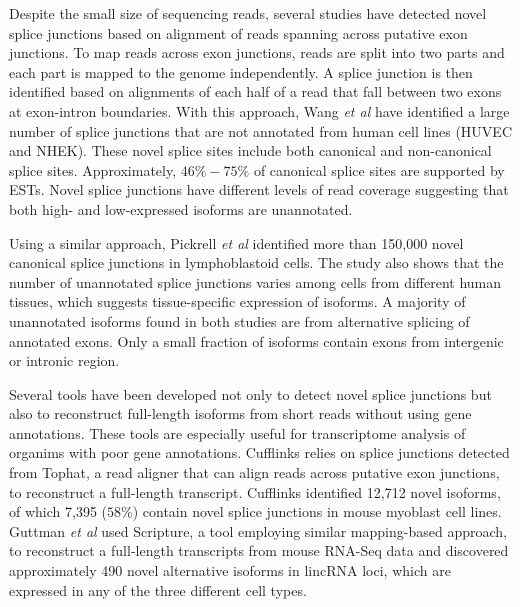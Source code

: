 \documentclass[10pt]{article}
\begin{document}

Despite the small size of sequencing reads, several studies have detected
novel splice junctions based on alignment of reads spanning across putative exon junctions.
To map reads across exon junctions, reads are split into two parts and each part is mapped
to the genome independently.
A splice junction is then identified based on alignments of each half of a read
that fall between two exons at exon-intron boundaries.
With this approach, Wang \emph{et al} have identified a large number of
splice junctions that are not annotated from human cell lines (HUVEC and NHEK)\cite{Wang:2011jq}.
These novel splice sites include both canonical and non-canonical splice sites.
Approximately, $46\%-75\%$ of canonical splice sites are supported by ESTs.
Novel splice junctions have different levels of read coverage suggesting that both high-
and low-expressed isoforms are unannotated.

Using a similar approach, Pickrell \emph{et al} identified more than 150,000 novel canonical splice junctions
in lymphoblastoid cells.
The study also shows that the number of unannotated splice junctions varies among cells from
different human tissues, which suggests tissue-specific expression of isoforms\cite{Pickrell:2010gt}.
A majority of unannotated isoforms found in both studies are from alternative splicing
of annotated exons. Only a small fraction of isoforms contain exons from intergenic or
intronic region.

Several tools have been developed not only to detect novel splice junctions but also to reconstruct
full-length isoforms from short reads without using gene annotations.
These tools are especially useful for transcriptome analysis of organims with poor gene annotations.
Cufflinks\cite{Trapnell:2010kd} relies on splice junctions detected from Tophat\cite{Trapnell:2009dp},
a read aligner that can align reads across putative exon junctions, to reconstruct a full-length transcript.
Cufflinks identified 12,712 novel isoforms, of which 7,395 ($58\%$) contain novel splice junctions in
mouse myoblast cell lines.
Guttman \emph{et al} used Scripture, a tool employing similar mapping-based approach, to reconstruct
a full-length transcripts from mouse RNA-Seq data and discovered approximately 490 novel alternative
isoforms in lincRNA loci, which are expressed in any of the three different cell types\cite{Guttman:2010io}.
\end{document}

